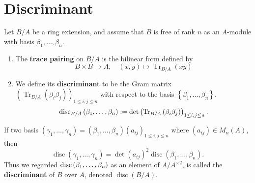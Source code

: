 \documentclass[12pt, oneside]{book}
\begin{document}
\section{Discriminant} %


\begin{definition}
    Let $B/A$ be a ring extension, and assume that $B$ is free of rank $n$ as an $A$-module with basis $\beta_1, \ldots, \beta_n$.
    \begin{enumerate}
        \item
              The \textbf{trace pairing} on $B/A$ is the bilinear form defined by
              \begin{equation*}
                  B \times B \rightarrow A, \quad(x, y) \mapsto \operatorname{Tr}_{B / A}(x y)
              \end{equation*}
        \item
              We define its \textbf{discriminant} to be the Gram matrix $\left(\operatorname{Tr}_{B / A}\left(\beta_i \beta_j\right)\right)_{1 \leq i, j \leq n}$ with respect to the basis $\left\{\beta_1, \ldots, \beta_n\right\}$.
              \begin{equation*}
                  \operatorname{disc}_{B/A}\left(\beta_1, \ldots, \beta_n\right)
                  :=
                  \operatorname{det}\left(\operatorname{Tr}_{B / A}\left(\beta_i \beta_j\right)\right)_{1 \leq i, j \leq n} .
              \end{equation*}
    \end{enumerate}
    \begin{remark}
        If two basis $\left(\gamma_1,\ldots,\gamma_n\right)=\left(\beta_1,\ldots,\beta_n\right)\left(a_{ij}\right)_{1 \leq i,j \leq n}$ where $\left(a_{ij}\right)\in M_n(A)$, then
        \begin{equation*}
            \operatorname{disc}\left(\gamma_1, \ldots, \gamma_n\right)=\operatorname{det}(a_{ij})^2 \operatorname{disc}\left(\beta_1, \ldots, \beta_n\right) .
        \end{equation*}
        Thus we regarded $\operatorname{disc}\left(\beta_1, \ldots, \beta_n\right)$ as an element of $A / A^{\times 2}$, is called the \textbf{discriminant} of $B$ over $A$, denoted $\operatorname{disc}(B / A)$.
    \end{remark}
\end{definition}
\end{document}
